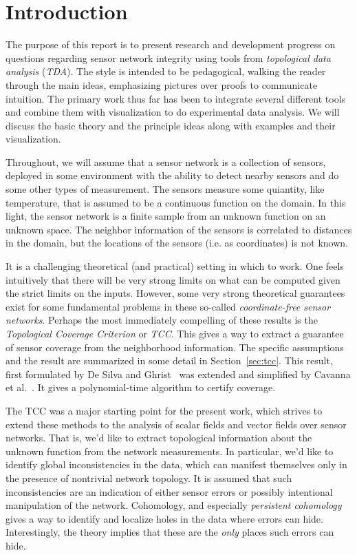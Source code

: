 \section{Introduction} %
\label{sec:introduction}

  The purpose of this report is to present research and development progress on questions regarding sensor network integrity using tools from \emph{topological data analysis} (\emph{TDA}).
  The style is intended to be pedagogical, walking the reader through the main ideas, emphasizing pictures over proofs to communicate intuition.
  The primary work thus far has been to integrate several different tools and combine them with visualization to do experimental data analysis.
  We will discuss the basic theory and the principle ideas along with examples and their visualization.

  Throughout, we will assume that a sensor network is a collection of sensors, deployed in some environment with the ability to detect nearby sensors and do some other types of measurement.
  The sensors measure some quiantity, like temperature, that is assumed to be a continuous function on the domain.
  In this light, the sensor network is a finite sample from an unknown function on an unknown space.
  The neighbor information of the sensors is correlated to distances in the domain, but the locations of the sensors (i.e. as coordinates) is not known.

  It is a challenging theoretical (and practical) setting in which to work.
  One feels intuitively that there will be very strong limits on what can be computed given the strict limits on the inputs.
  However, some very strong theoretical guarantees exist for some fundamental problems in these so-called \emph{coordinate-free sensor networks}.
  Perhaps the most immediately compelling of these results is the \emph{Topological Coverage Criterion} or \emph{TCC}.
  This gives a way to extract a guarantee of sensor coverage from the neighborhood information.
  The specific assumptions and the result are summarized in some detail in Section~\ref{sec:tcc}.
  This result, first formulated by De Silva and Ghrist~\cite{desilve07coverage} was extended and simplified by Cavanna et al.~\cite{cavanna17when}.
  It gives a polynomial-time algorithm to certify coverage.

  The TCC was a major starting point for the present work, which strives to extend these methods to the analysis of scalar fields and vector fields over sensor networks.
  That is, we'd like to extract topological information about the unknown function from the network measurements.
  In particular, we'd like to identify global inconsistencies in the data, which can manifest themselves only in the presence of nontrivial network topology.
  It is assumed that such inconsistencies are an indication of either sensor errors or possibly intentional manipulation of the network.
  Cohomology, and especially \emph{persistent cohomology} gives a way to identify and localize holes in the data where errors can hide.
  Interestingly, the theory implies that these are the \emph{only} places such errors can hide.

